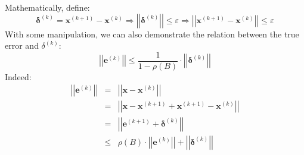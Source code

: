 \begin{itemize}
    Mathematically, define:
    \begin{equation*}
        \mathbf{\delta}^{\left(k\right)} = \mathbf{x}^{\left(k+1\right)} - \mathbf{x}^{\left(k\right)} \Longrightarrow \left|\left|\mathbf{\delta}^{\left(k\right)}\right|\right| \le \varepsilon \Longrightarrow \left|\left|\mathbf{x}^{\left(k+1\right)} - \mathbf{x}^{\left(k\right)}\right|\right| \le \varepsilon
    \end{equation*}
    With some manipulation, we can also demonstrate the relation between the true error and $\delta^{\left(k\right)}$:
    \begin{equation*}
        \left|\left|\mathbf{e}^{\left(k\right)}\right|\right| \le \dfrac{1}{1 - \rho\left(B\right)} \cdot \left|\left|\mathbf{\delta}^{\left(k\right)}\right|\right|
    \end{equation*}
    Indeed:
    \begin{equation*}
        \begin{array}{rcl}
            \left|\left|\mathbf{e}^{\left(k\right)}\right|\right| &=& \left|\left|\mathbf{x}-\mathbf{x}^{\left(k\right)}\right|\right| \\ [.5em]
            &=& \left|\left|\mathbf{x}-\mathbf{x}^{\left(k+1\right)} + \mathbf{x}^{\left(k+1\right)} - \mathbf{x}^{\left(k\right)}\right|\right| \\ [.5em]
            &=& \left|\left|\mathbf{e}^{\left(k+1\right)} + \mathbf{\delta}^{\left(k\right)}\right|\right| \\ [.5em]
            &\le& \rho\left(B\right) \cdot \left|\left|\mathbf{e}^{\left(k\right)}\right|\right| + \left|\left|\mathbf{\delta}^{\left(k\right)}\right|\right|
        \end{array}
    \end{equation*}
\end{itemize}